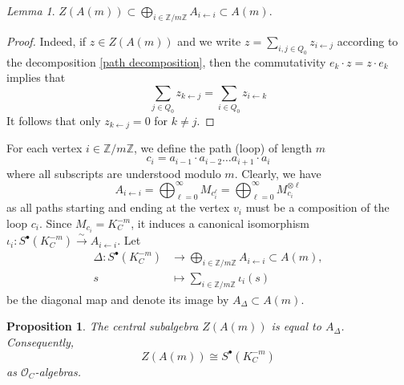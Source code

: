 \documentclass[11pt]{amsart}
\theoremstyle{plain}
\newtheorem{prop}[theorem]{Proposition}
\theoremstyle{definition}
\theoremstyle{remark}
\newtheorem{lem}[theorem]{Lemma}
\def\O{\mathcal{O}}
\def\zm{\mathbb{Z}/m\mathbb{Z}}
\begin{document}
    \begin{lem}\label{central1}
    $Z(A(m))\subset \bigoplus_{i\in \zm} A_{i\leftarrow i}\subset A(m)$.
    \end{lem}
    \begin{proof}
        Indeed, if $z\in Z(A(m))$ and we write $z= \sum_{i,j\in Q_0} z_{i\leftarrow j}$ according to the decomposition \ref{path decomposition}, then the commutativity $e_k\cdot z = z\cdot e_k$ implies that 
        \[  \sum_{j\in Q_0} z_{k\leftarrow j} = \sum_{i\in Q_0} z_{i\leftarrow k} \]
        It follows that only $z_{k\leftarrow j}=0$ for $k\neq j$. 
    \end{proof}
For each vertex $i\in \zm$, we define the path (loop) of length $m$ 
\[c_i= a_{i-1}\cdot a_{i-2} \dots a_{i+1}\cdot a_{i}\]
where all subscripts are understood modulo $m$. Clearly, we have 
\[ A_{i\leftarrow i }= \bigoplus_{\ell=0}^\infty M_{c_i^\ell}= \bigoplus_{\ell=0}^\infty M_{c_i}^{\otimes \ell} \]
as all paths starting and ending at the vertex $v_i$ must be a composition of the loop $c_i$. Since $M_{c_i}= K_C^{-m}$, it induces a canonical isomorphism $\iota_i: S^{\bullet}(K_C^{-m}) \xrightarrow{\sim} A_{i\leftarrow i}$. Let
\begin{align}
    \Delta : S^\bullet (K_C^{-m}) &\to  \bigoplus_{i\in \zm} A_{i\leftarrow i}\subset A(m),\label{eq:diagonal} \\
    s &\mapsto \sum_{i\in \zm}\iota_i(s) \nonumber
\end{align}
be the diagonal map and denote its image by $A_\Delta\subset A(m)$. 
\begin{prop}\label{central2}
The central subalgebra $Z(A(m))$ is equal to $A_{\Delta}$. Consequently,
$$ Z(A(m)) \cong S^\bullet(K_C^{-m}) $$
as $\O_C$-algebras. 
\end{prop}
\end{document}
